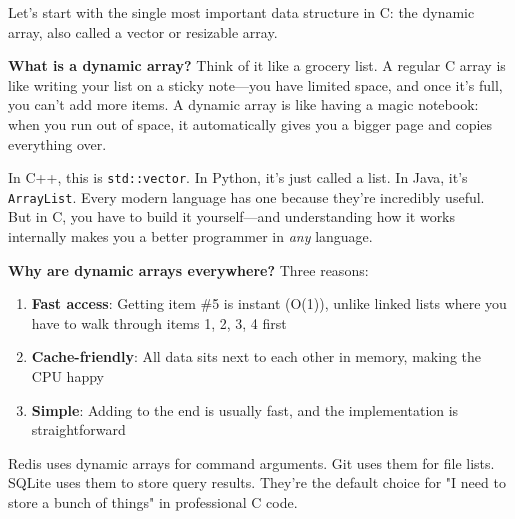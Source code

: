 Let's start with the single most important data structure in C: the dynamic array, also called a vector or resizable array.

\textbf{What is a dynamic array?} Think of it like a grocery list. A regular C array is like writing your list on a sticky note---you have limited space, and once it's full, you can't add more items. A dynamic array is like having a magic notebook: when you run out of space, it automatically gives you a bigger page and copies everything over.

In C++, this is \texttt{std::vector}. In Python, it's just called a list. In Java, it's \texttt{ArrayList}. Every modern language has one because they're incredibly useful. But in C, you have to build it yourself---and understanding how it works internally makes you a better programmer in \textit{any} language.

\textbf{Why are dynamic arrays everywhere?} Three reasons:
\begin{enumerate}
    \item \textbf{Fast access}: Getting item \#5 is instant (O(1)), unlike linked lists where you have to walk through items 1, 2, 3, 4 first
    \item \textbf{Cache-friendly}: All data sits next to each other in memory, making the CPU happy
    \item \textbf{Simple}: Adding to the end is usually fast, and the implementation is straightforward
\end{enumerate}

Redis uses dynamic arrays for command arguments. Git uses them for file lists. SQLite uses them to store query results. They're the default choice for "I need to store a bunch of things" in professional C code.

